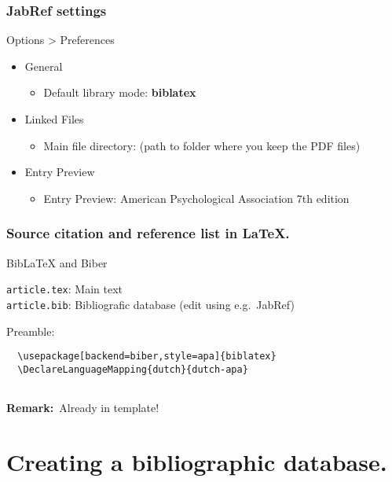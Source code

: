 \documentclass[aspectratio=169]{beamer}
\begin{document}
\begin{frame}
    \frametitle{JabRef settings}
    
   Options > Preferences

   \begin{itemize}
        \item General
        \begin{itemize}
            \item Default library mode: \textbf{biblatex}
        \end{itemize}
        \item Linked Files
        \begin{itemize}
            \item Main file directory: (path to folder where you keep the PDF files)
        \end{itemize}
        \item{Entry Preview}
        \begin{itemize}
            \item Entry Preview: American Psychological Association 7th edition
        \end{itemize}
    \end{itemize}
    
\end{frame}
\begin{frame}[fragile]
  \frametitle{Source citation and reference list in {\LaTeX}.}

  Bib{\LaTeX} and Biber

  \vspace{18pt}

  \verb|article.tex|: Main text\\
  \verb|article.bib|: Bibliografic database (edit using e.g.~JabRef)

  \bigskip

  Preamble:

  \begin{verbatim}
  \usepackage[backend=biber,style=apa]{biblatex}
  \DeclareLanguageMapping{dutch}{dutch-apa}
  
  \end{verbatim}

    \textbf{Remark:}\ Already in template!   

\end{frame}

\section{Creating a bibliographic database.}
\end{document}
